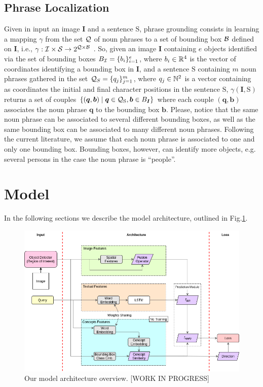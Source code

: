 \documentclass{article}
\begin{document}
\subsection{Phrase Localization}

Given in input an image $\bm{I}$ and a
sentence $\mathrm{S}$, phrase grounding consists in learning a mapping
$\gamma$ from the set $\mathcal{Q}$ of noun phrases to a set of bounding box
$\mathcal{B}$ defined on $\bm{I}$, i.e., $\gamma : \mathcal{I} \times \mathcal{S}
\rightarrow 2^{\mathcal{Q} \times \mathcal{B}}$ \cite{rigoni2021better}. So, given
an image $\bm{I}$ containing $e$ objects identified via the set of
bounding boxes $B_{\mathcal{I}} = \{ b_i \}^e_{i=1}$, where $b_i \in \mathbb{R}^4$
is the vector of coordinates identifying a bounding box in $\bm{I}$,
and a sentence $\mathrm{S}$ containing $m$ noun phrases gathered in
the set $\mathcal{Q}_S = \{ q_j \}^m_{j=1}$, where $q_j \in \mathbb{N}^2$ is a
vector containing as coordinates the initial and final character
positions in the sentence $\mathrm{S}$, $\gamma(\bm{I}, \mathrm{S})$
returns a set of couples $\{ (\bm{q}, \bm{b}) \mid \bm{q} \in
\mathcal{Q}_{\mathrm{S}}, \bm{b} \in B_{\bm{I}} \}$ where each couple
$(\bm{q}, \bm{b})$ associates the noun phrase $\bm{q}$ to the bounding
box $\bm{b}$. Please, notice that the same noun phrase can be
associated to several different bounding boxes, as well as the same
bounding box can be associated to many different noun phrases.
Following the current literature, we assume that each noun phrase is
associated to one and only one bounding box. Bounding boxes, however,
can identify more objects, e.g. several persons in the case the noun
phrase is ``people''.

\section{Model}

In the following sections we describe the model architecture, outlined
in Fig.\ref{fig:model-architecture}.

\begin{figure}
    \centering
    \includegraphics[width=1.0\textwidth]{figures/model-architecture.png}
    \caption[TODO]{Our model architecture overview. [WORK IN PROGRESS]}
    \label{fig:model-architecture}
  \end{figure}
\end{document}
